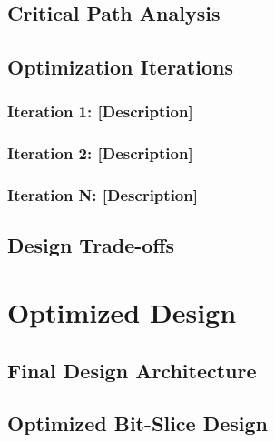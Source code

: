\documentclass[12pt,letterpaper]{article}
\begin{document}
\subsection{Critical Path Analysis}


\subsection{Optimization Iterations}

\subsubsection{Iteration 1: [Description]}


\subsubsection{Iteration 2: [Description]}

\subsubsection{Iteration N: [Description]}

\subsection{Design Trade-offs}


\section{Optimized Design}
\label{sec:optimized}


\subsection{Final Design Architecture}

\subsection{Optimized Bit-Slice Design}
\end{document}
